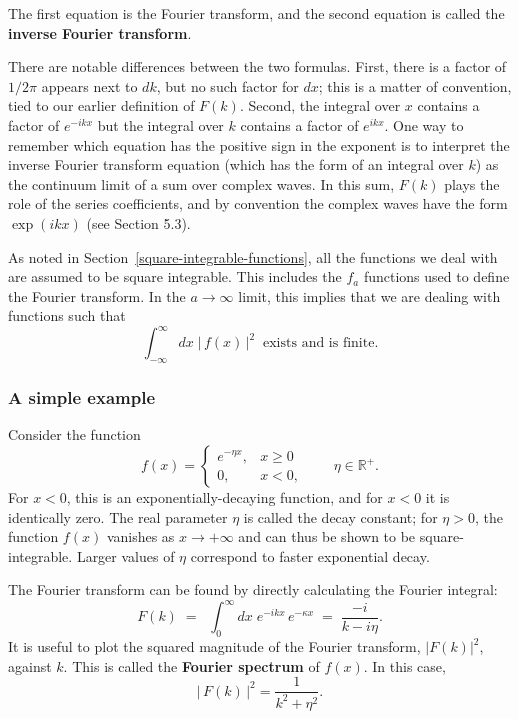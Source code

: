\documentclass[10pt,a4paper]{article}
\begin{document}
\noindent
The first equation is the Fourier transform, and the second equation is
called the \textbf{inverse Fourier transform}.

There are notable differences between the two formulas. First, there
is a factor of $1/2\pi$ appears next to $dk$, but no such factor for
$dx$; this is a matter of convention, tied to our earlier definition
of $F(k)$. Second, the integral over $x$ contains a factor of
$e^{-ikx}$ but the integral over $k$ contains a factor of
$e^{ikx}$. One way to remember which equation has the positive sign in
the exponent is to interpret the inverse Fourier transform equation
(which has the form of an integral over $k$) as the continuum limit of
a sum over complex waves. In this sum, $F(k)$ plays the role of the
series coefficients, and by convention the complex waves have the form
$\exp(ikx)$ (see Section 5.3).

As noted in Section~\ref{square-integrable-functions}, all the
functions we deal with are assumed to be square integrable. This
includes the $f_a$ functions used to define the Fourier transform. In
the $a \rightarrow \infty$ limit, this implies that we are dealing
with functions such that
\begin{equation}
\int_{-\infty}^{\infty} dx\; \big|\,f(x)\,\big|^2\;\;\text{exists and is finite}.
\end{equation}

\subsubsection{A simple example}
\label{simple-example}

Consider the function
\begin{equation}
f(x) = \left\{\begin{array}{cl}e^{-\eta x}, & x \ge 0 \\ 0, & x < 0,\end{array}\right. \qquad \eta \in \mathbb{R}^+.
\end{equation}
For $x < 0$, this is an exponentially-decaying function, and for
$x < 0$ it is identically zero. The real parameter $\eta$ is called
the decay constant; for $\eta > 0$, the function $f(x)$ vanishes as
$x \rightarrow +\infty$ and can thus be shown to be square-integrable.
Larger values of $\eta$ correspond to faster exponential decay.

The Fourier transform can be found by directly calculating the Fourier
integral:
\begin{equation}
F(k) \;=\; \;\int_{0}^\infty dx\; e^{-i kx}\, e^{-\kappa x} \;=\; \frac{-i}{k - i \eta}.
\end{equation}
It is useful to plot the squared magnitude of the Fourier transform,
$|F(k)|^2$, against $k$. This is called the \textbf{Fourier
spectrum} of $f(x)$. In this case,
\begin{equation}
\big|\,F(k)\,\big|^2 = \frac{1}{k^2 + \eta^2}.
\end{equation}
\end{document}
